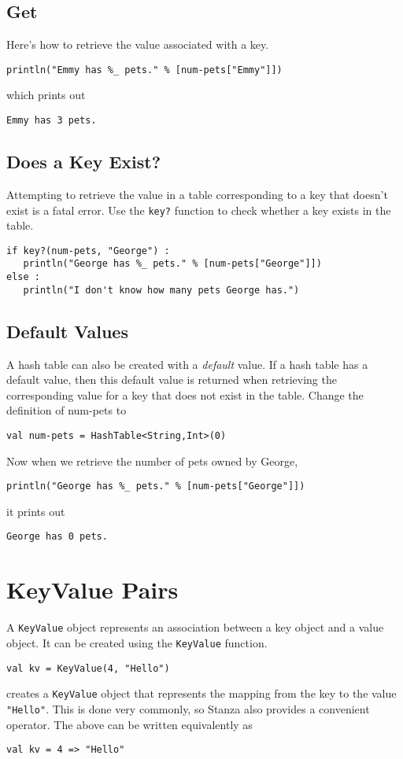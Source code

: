 \documentclass[10pt,oneside]{book}
\begin{document}
\subsection*{Get}
Here's how to retrieve the value associated with a key.
\begin{lstlisting}
println("Emmy has %_ pets." % [num-pets["Emmy"]])
\end{lstlisting}
which prints out
\begin{lstlisting}
Emmy has 3 pets.
\end{lstlisting}

\subsection*{Does a Key Exist?}
Attempting to retrieve the value in a table corresponding to a key that doesn't exist is a fatal error. Use the \texttt{\frenchspacing key?} function to check whether a key exists in the table.
\begin{lstlisting}
if key?(num-pets, "George") :
   println("George has %_ pets." % [num-pets["George"]])
else :
   println("I don't know how many pets George has.")
\end{lstlisting}

\subsection*{Default Values}
A hash table can also be created with a {\em default} value. If a hash table has a default value, then this default value is returned when retrieving the corresponding value for a key that does not exist in the table. Change the definition of num-pets to
\begin{lstlisting}
val num-pets = HashTable<String,Int>(0)
\end{lstlisting}
Now when we retrieve the number of pets owned by George,
\begin{lstlisting}
println("George has %_ pets." % [num-pets["George"]])
\end{lstlisting}
it prints out
\begin{lstlisting}
George has 0 pets.
\end{lstlisting}

\section{KeyValue Pairs}
A \texttt{\frenchspacing KeyValue} object represents an association between a key object and a value object. It can be created using the \texttt{\frenchspacing KeyValue} function.
\begin{lstlisting}
val kv = KeyValue(4, "Hello")
\end{lstlisting}
creates a \texttt{\frenchspacing KeyValue} object that represents the mapping from the key \texttt{} to the value \texttt{\frenchspacing "Hello"}. This is done very commonly, so Stanza also provides a convenient operator. The above can be written equivalently as
\begin{lstlisting}
val kv = 4 => "Hello"
\end{lstlisting}
\end{document}

